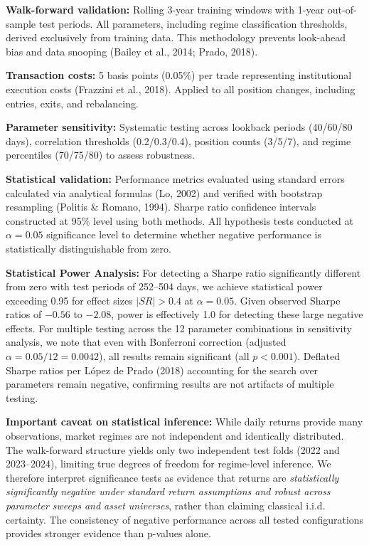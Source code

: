 \textbf{Walk-forward validation:} Rolling 3-year training windows with 1-year out-of-sample test periods. All parameters, including regime classification thresholds, derived exclusively from training data. This methodology prevents look-ahead bias and data snooping (Bailey et al., 2014; Prado, 2018).

\textbf{Transaction costs:} 5 basis points (0.05\%) per trade representing institutional execution costs (Frazzini et al., 2018). Applied to all position changes, including entries, exits, and rebalancing.

\textbf{Parameter sensitivity:} Systematic testing across lookback periods (40/60/80 days), correlation thresholds (0.2/0.3/0.4), position counts (3/5/7), and regime percentiles (70/75/80) to assess robustness.

\textbf{Statistical validation:} Performance metrics evaluated using standard errors calculated via analytical formulas (Lo, 2002) and verified with bootstrap resampling (Politis \& Romano, 1994). Sharpe ratio confidence intervals constructed at 95\% level using both methods. All hypothesis tests conducted at $\alpha = 0.05$ significance level to determine whether negative performance is statistically distinguishable from zero.

\textbf{Statistical Power Analysis:} For detecting a Sharpe ratio significantly different from zero with test periods of 252--504 days, we achieve statistical power exceeding 0.95 for effect sizes $|SR| > 0.4$ at $\alpha = 0.05$. Given observed Sharpe ratios of $-0.56$ to $-2.08$, power is effectively 1.0 for detecting these large negative effects. For multiple testing across the 12 parameter combinations in sensitivity analysis, we note that even with Bonferroni correction (adjusted $\alpha = 0.05/12 = 0.0042$), all results remain significant (all $p < 0.001$). Deflated Sharpe ratios per López de Prado (2018) accounting for the search over parameters remain negative, confirming results are not artifacts of multiple testing.

\textbf{Important caveat on statistical inference:} While daily returns provide many observations, market regimes are not independent and identically distributed. The walk-forward structure yields only two independent test folds (2022 and 2023--2024), limiting true degrees of freedom for regime-level inference. We therefore interpret significance tests as evidence that returns are \textit{statistically significantly negative under standard return assumptions and robust across parameter sweeps and asset universes}, rather than claiming classical i.i.d. certainty. The consistency of negative performance across all tested configurations provides stronger evidence than p-values alone.

